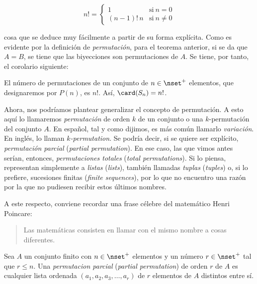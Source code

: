 \begin{equation*}
  n! = \left\{
  \begin{array}{ll}
    1               & \text{si} \ n = 0 \\
    (n - 1)! \, n   & \text{si} \ n \neq 0
  \end{array}
  \right.
\end{equation*}

\noindent cosa que se deduce muy fácilmente a partir de su forma explícita.
Como es evidente por la definición de \emph{permutación}, para el teorema
anterior, si se da que $A = B$, se tiene que las biyecciones son
permutaciones de $A$. Se tiene, por tanto, el corolario siguiente:

\begin{corollary}
  El número de permutaciones de un conjunto de $n \in \nset^{+}$ elementos,
  que designaremos por $P(n)$, es $n!$. Así, $\card(S_n) = n!$.
\end{corollary}

Ahora, nos podríamos plantear generalizar el concepto de permutación. A esto
aquí lo llamaremos \emph{permutación} de orden $k$ de un conjunto o una
$k$-permutación del conjunto $A$. En español, tal y como dijimos, es más
común llamarlo \emph{variación}. En inglés, lo llaman $k$\emph{-permutation}.
Se podría decir, si se quiere ser explícito, \emph{permutación parcial}
(\emph{partial permutation}). En ese caso, las que vimos antes serían,
entonces, \emph{permutaciones totales} (\emph{total permutations}). Si lo
piensa, representan simplemente a \emph{listas} (\emph{lists}), también
llamadas \emph{tuplas} (\emph{tuples}) o, si lo prefiere, sucesiones finitas
(\emph{finite sequences}), por lo que no encuentro una razón por la que no
pudiesen recibir estos últimos nombres.

A este respecto, conviene recordar una frase célebre del matemático Henri
Poincare:

\begin{quote}
  Las matemáticas consisten en llamar con el mismo nombre a cosas
  diferentes.
\end{quote}

\begin{deffinition}
  Sea $A$ un conjunto finito con $n \in \nset^{+}$ elementos y un número $r
  \in \nset^{+}$ tal que $r \leq n$. Una \emph{permutacion parcial}
  (\emph{partial permutation}) de orden $r$ de $A$ es cualquier lista
  ordenada $(a_1, a_2, a_3, \ldots, a_r)$ de $r$ elementos de $A$ distintos
  entre sí.
\end{deffinition}

